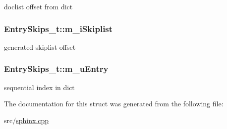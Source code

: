 doclist offset from dict 

\hypertarget{structEntrySkips__t_a9c9d8e04bfbc91b6624411e015e7059f}{
\subsubsection[{m\-\_\-i\-Skiplist}]{ Entry\-Skips\-\_\-t\-::m\-\_\-i\-Skiplist}}\label{structEntrySkips__t_a9c9d8e04bfbc91b6624411e015e7059f}


generated skiplist offset 

\hypertarget{structEntrySkips__t_acae8bb6bab57a4bacd418ced0f24d0d3}{
\subsubsection[{m\-\_\-u\-Entry}]{ Entry\-Skips\-\_\-t\-::m\-\_\-u\-Entry}}\label{structEntrySkips__t_acae8bb6bab57a4bacd418ced0f24d0d3}


sequential index in dict 



The documentation for this struct was generated from the following file\-:\begin{DoxyCompactItemize}
\item 
src/\hyperlink{sphinx_8cpp}{sphinx.\-cpp}\end{DoxyCompactItemize}

